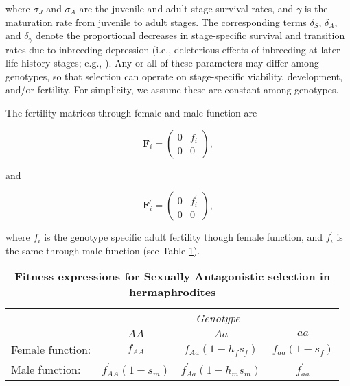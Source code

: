 \documentclass[11pt]{article}
\def\mbf#1{\mathbf{#1}}
\begin{document}
\noindent where $\sigma_J$ and $\sigma_A$ are the juvenile and adult stage survival rates, and $\gamma$ is the maturation rate from juvenile to adult stages. The corresponding terms $\delta_S$, $\delta_A$, and $\delta_{\gamma}$ denote the proportional decreases in stage-specific survival and transition rates due to inbreeding depression (i.e., deleterious effects of inbreeding at later life-history stages; e.g., \citealt{HarderRoutely2006}). Any or all of these parameters may differ among genotypes, so that selection can operate on stage-specific viability, development, and/or fertility. For simplicity, we assume these are constant among genotypes. 

The fertility matrices through female and male function are
\begin{linenomath*}
\begin{equation}\label{eq:FS}
	\mbf{F}_{i} = \left(
					\begin{array}{cc}
						0 & f_{i} \\
						0 & 0
					\end{array}
				\right),
\end{equation}
\end{linenomath*}
\noindent and
\begin{linenomath*}
\begin{equation}\label{eq:FX}
	\mbf{F}^{\prime}_{i} = \left(
					\begin{array}{cc}
						0 & f^{\prime}_{i} \\
						0 & 0
					\end{array}
				\right),
\end{equation}
\end{linenomath*}

\noindent where $f_{i}$ is the genotype specific adult fertility though female function, and $f^{\prime}_{i}$ is the same through male function (see Table \ref{tab:Fitness}). 


\begin{table}[htbp]
 \centering
 \caption{\bf Fitness expressions for Sexually Antagonistic selection in hermaphrodites}
\label{tab:Fitness}
\begin{tabular}{lccc}
 \toprule
					&  \multicolumn{3}{c}{{\textit{Genotype}}} \\ 
\cline{2-4}
					& $AA$			& $Aa$ 					& $aa$ 		\\ \hline
Female function:	& $f_{AA}$		& $f_{Aa}(1 - h_f s_f)$	& $f_{aa}(1 - s_f)$ \\	
Male function:		& $f^{\prime}_{AA}(1 - s_m)$& $f^{\prime}_{Aa}(1 - h_m s_m)$	& $f^{\prime}_{aa}$ 		\\	
\hline
\end{tabular}
\end{table}
\end{document}
